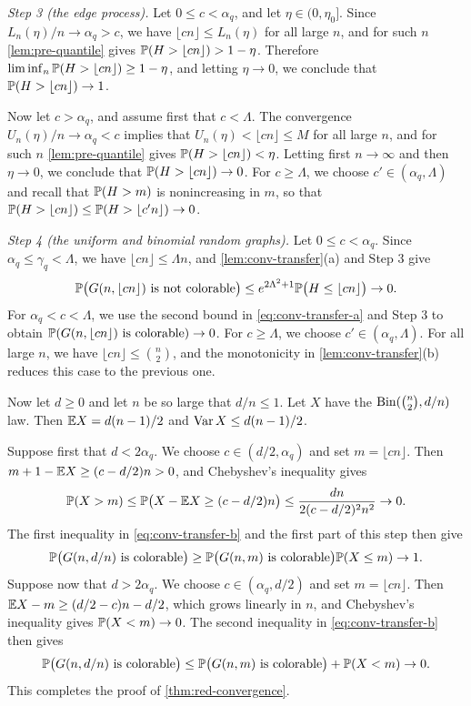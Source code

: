 \emph{Step 3 (the edge process).} Let $0 \le c < \alpha_q$, and let $\eta \in (0, \eta_0]$. Since $L_n(\eta)/n \to \alpha_q > c$, we have $\lfloor cn \rfloor \le L_n(\eta)$ for all large $n$, and for such $n$ \cref{lem:pre-quantile} gives $\mathbb P(H > \lfloor cn \rfloor) > 1 - \eta$. Therefore $\liminf_n \mathbb P(H > \lfloor cn \rfloor) \ge 1 - \eta$, and letting $\eta \to 0$, we conclude that $\mathbb P(H > \lfloor cn \rfloor) \to 1$.

Now let $c > \alpha_q$, and assume first that $c < \Lambda$. The convergence $U_n(\eta)/n \to \alpha_q < c$ implies that $U_n(\eta) < \lfloor cn \rfloor \le M$ for all large $n$, and for such $n$ \cref{lem:pre-quantile} gives $\mathbb P(H > \lfloor cn \rfloor) < \eta$. Letting first $n \to \infty$ and then $\eta \to 0$, we conclude that $\mathbb P(H > \lfloor cn \rfloor) \to 0$. For $c \ge \Lambda$, we choose $c' \in (\alpha_q, \Lambda)$ and recall that $\mathbb P(H > m)$ is nonincreasing in $m$, so that $\mathbb P(H > \lfloor cn \rfloor) \le \mathbb P(H > \lfloor c' n \rfloor) \to 0$.

\emph{Step 4 (the uniform and binomial random graphs).} Let $0 \le c < \alpha_q$. Since $\alpha_q \le \gamma_q < \Lambda$, we have $\lfloor cn \rfloor \le \Lambda n$, and \cref{lem:conv-transfer}(a) and Step 3 give
\[
\mathbb P\big(G(n, \lfloor cn \rfloor) \text{ is not colorable}\big) \le e^{2\Lambda^2 + 1} \mathbb P\big(H \le \lfloor cn \rfloor\big) \to 0.
\]
For $\alpha_q < c < \Lambda$, we use the second bound in \eqref{eq:conv-transfer-a} and Step 3 to obtain $\mathbb P(G(n, \lfloor cn \rfloor) \text{ is colorable}) \to 0$. For $c \ge \Lambda$, we choose $c' \in (\alpha_q, \Lambda)$. For all large $n$, we have $\lfloor cn \rfloor \le \binom{n}{2}$, and the monotonicity in \cref{lem:conv-transfer}(b) reduces this case to the previous one.

Now let $d \ge 0$ and let $n$ be so large that $d/n \le 1$. Let $X$ have the $\operatorname{Bin}(\binom{n}{2}, d/n)$ law. Then $\mathbb E X = d(n - 1)/2$ and $\operatorname{Var} X \le d(n - 1)/2$.

Suppose first that $d < 2\alpha_q$. We choose $c \in (d/2, \alpha_q)$ and set $m = \lfloor cn \rfloor$. Then $m + 1 - \mathbb E X \ge (c - d/2) n > 0$, and Chebyshev's inequality gives
\[
\mathbb P(X > m) \le \mathbb P\big(X - \mathbb E X \ge (c - d/2) n\big) \le \frac{d n}{2 (c - d/2)^2 n^2} \to 0.
\]
The first inequality in \eqref{eq:conv-transfer-b} and the first part of this step then give
\[
\mathbb P\big(G(n, d/n) \text{ is colorable}\big) \ge \mathbb P\big(G(n, m) \text{ is colorable}\big) \mathbb P(X \le m) \to 1.
\]
Suppose now that $d > 2\alpha_q$. We choose $c \in (\alpha_q, d/2)$ and set $m = \lfloor cn \rfloor$. Then $\mathbb E X - m \ge (d/2 - c) n - d/2$, which grows linearly in $n$, and Chebyshev's inequality gives $\mathbb P(X < m) \to 0$. The second inequality in \eqref{eq:conv-transfer-b} then gives
\[
\mathbb P\big(G(n, d/n) \text{ is colorable}\big) \le \mathbb P\big(G(n, m) \text{ is colorable}\big) + \mathbb P(X < m) \to 0.
\]
This completes the proof of \cref{thm:red-convergence}.

